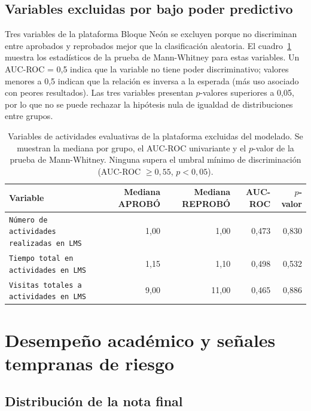 \documentclass[12pt, letterpaper, openany]{report}
\begin{document}
\subsection{Variables excluidas por bajo poder predictivo}

Tres variables de la plataforma Bloque Neón se excluyen porque no discriminan entre aprobados y reprobados mejor que la clasificación aleatoria. El cuadro~\ref{tab:excl_vars} muestra los estadísticos de la prueba de Mann-Whitney para estas variables. Un AUC-ROC = 0,5 indica que la variable no tiene poder discriminativo; valores menores a 0,5 indican que la relación es inversa a la esperada (más uso asociado con peores resultados). Las tres variables presentan $p$-valores superiores a 0,05, por lo que no se puede rechazar la hipótesis nula de igualdad de distribuciones entre grupos. 

\begin{table}[htbp]
  \centering
  \caption{Variables de actividades evaluativas de la plataforma excluidas del modelado. Se muestran la mediana por grupo, el AUC-ROC univariante y el $p$-valor de la prueba de Mann-Whitney. Ninguna supera el umbral mínimo de discriminación (AUC-ROC $\geq 0{,}55$, $p < 0{,}05$).}
  \label{tab:excl_vars}
  \small
  \begin{tabularx}{\textwidth}{Xrrrr}
    \toprule
    Variable & Mediana APROBÓ & Mediana REPROBÓ & AUC-ROC & $p$-valor \\
    \midrule
    \texttt{Número de actividades realizadas en LMS} & 1,00 & 1,00 & 0,473 & 0,830 \\ \addlinespace
    \texttt{Tiempo total en actividades en LMS}      & 1,15 & 1,10 & 0,498 & 0,532 \\ \addlinespace
    \texttt{Visitas totales a actividades en LMS}    & 9,00 & 11,00 & 0,465 & 0,886 \\
    \bottomrule
  \end{tabularx}
\end{table}

\section{Desempeño académico y señales tempranas de riesgo}

\subsection{Distribución de la nota final}
\end{document}
